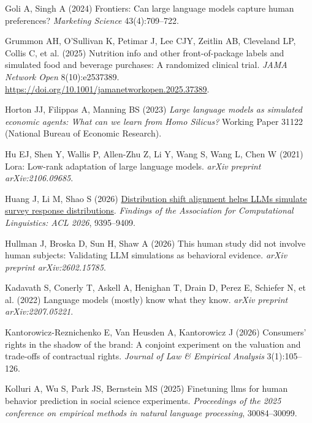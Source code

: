 \documentclass[
  11pt,
  letterpaper,
]{article}
\newlength{\cslhangindent}
\newenvironment{CSLReferences}[2] %
 {\begin{list}{}{%
  \setlength{\itemindent}{0pt}
  \setlength{\leftmargin}{0pt}
  \setlength{\parsep}{0pt}
  \ifodd #1
   \setlength{\leftmargin}{\cslhangindent}
   \setlength{\itemindent}{-1\cslhangindent}
  \fi
  \setlength{\itemsep}{#2\baselineskip}}}
 {\end{list}}
\begin{document}
\begin{CSLReferences}{1}{0}
Goli A, Singh A (2024) Frontiers: Can large language models capture
human preferences? \emph{Marketing Science} 43(4):709--722.

Grummon AH, O'Sullivan K, Petimar J, Lee CJY, Zeitlin AB, Cleveland LP,
Collis C, et al. (2025) Nutrition info and other front-of-package labels
and simulated food and beverage purchases: A randomized clinical trial.
\emph{JAMA Network Open} 8(10):e2537389.
\url{https://doi.org/10.1001/jamanetworkopen.2025.37389}.

Horton JJ, Filippas A, Manning BS (2023) \emph{Large language models as
simulated economic agents: What can we learn from {Homo Silicus}?}
Working Paper 31122 (National Bureau of Economic Research).

Hu EJ, Shen Y, Wallis P, Allen-Zhu Z, Li Y, Wang S, Wang L, Chen W
(2021) Lora: Low-rank adaptation of large language models. \emph{arXiv
preprint arXiv:2106.09685}.

Huang J, Li M, Shao S (2026)
\href{https://doi.org/10.18653/v1/2026.findings-acl.457}{Distribution
shift alignment helps {LLM}s simulate survey response distributions}.
\emph{Findings of the {A}ssociation for {C}omputational {L}inguistics:
{ACL} 2026}, 9395--9409.

Hullman J, Broska D, Sun H, Shaw A (2026) This human study did not
involve human subjects: Validating LLM simulations as behavioral
evidence. \emph{arXiv preprint arXiv:2602.15785}.

{Kadavath S, Conerly T, Askell A, Henighan T, Drain D, Perez E, Schiefer
N, et al.} (2022) Language models (mostly) know what they know.
\emph{arXiv preprint arXiv:2207.05221}.

Kantorowicz-Reznichenko E, Van Heusden A, Kantorowicz J (2026)
Consumers' rights in the shadow of the brand: A conjoint experiment on
the valuation and trade-offs of contractual rights. \emph{Journal of Law
\& Empirical Analysis} 3(1):105--126.

Kolluri A, Wu S, Park JS, Bernstein MS (2025) Finetuning llms for human
behavior prediction in social science experiments. \emph{Proceedings of
the 2025 conference on empirical methods in natural language
processing}, 30084--30099.


\end{CSLReferences}
\end{document}

